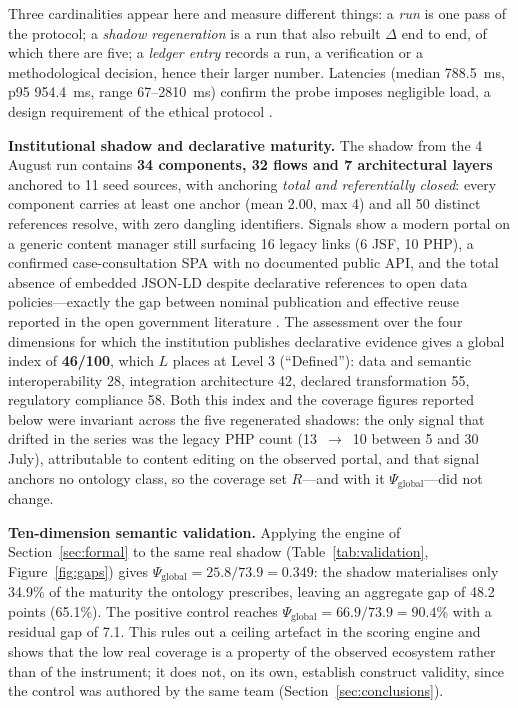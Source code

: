 \documentclass[engproc,proceedingpaper,submit,moreauthors]{Definitions/mdpi}
\begin{document}
    Three cardinalities appear here and measure different things: a \emph{run} is one pass of the protocol; a \emph{shadow regeneration} is a run that also rebuilt $\Delta$ end to end, of which there are five; a \emph{ledger entry} records a run, a verification or a methodological decision, hence their larger number. Latencies (median 788.5~ms, p95 954.4~ms, range 67--2810~ms) confirm the probe imposes negligible load, a design requirement of the ethical protocol \cite{Krotov2020}.

    \textbf{Institutional shadow and declarative maturity.} 
    The shadow from the 4 August run contains \textbf{34 components, 32 flows and 7 architectural layers} anchored to 11 seed sources, with anchoring \emph{total and referentially closed}: every component carries at least one anchor (mean 2.00, max 4) and all 50 distinct references resolve, with zero dangling identifiers. Signals show a modern portal on a generic content manager still surfacing 16 legacy links (6 JSF, 10 PHP), a confirmed case-consultation SPA with no documented public API, and the total absence of embedded JSON-LD despite declarative references to open data policies---exactly the gap between nominal publication and effective reuse reported in the open government literature \cite{Janssen2012,Attard2015}. The assessment over the four dimensions for which the institution publishes declarative evidence gives a global index of \textbf{46/100}, which $L$ places at Level 3 (``Defined''): data and semantic interoperability 28, integration architecture 42, declared transformation 55, regulatory compliance 58. Both this index and the coverage figures reported below were invariant across the five regenerated shadows: the only signal that drifted in the series was the legacy PHP count (13~$\rightarrow$~10 between 5 and 30 July), attributable to content editing on the observed portal, and that signal anchors no ontology class, so the coverage set $R$---and with it $\Psi_{\mathrm{global}}$---did not change.

    \textbf{Ten-dimension semantic validation.} Applying the engine of Section~\ref{sec:formal} to the same real shadow (Table~\ref{tab:validation}, Figure~\ref{fig:gaps}) gives $\Psi_{\mathrm{global}}=25.8/73.9=\mathbf{0.349}$: the shadow materialises only 34.9\% of the maturity the ontology prescribes, leaving an aggregate gap of 48.2 points (65.1\%). The positive control reaches $\Psi_{\mathrm{global}}=66.9/73.9=90.4\%$ with a residual gap of 7.1. This rules out a ceiling artefact in the scoring engine and shows that the low real coverage is a property of the observed ecosystem rather than of the instrument; it does not, on its own, establish construct validity, since the control was authored by the same team (Section~\ref{sec:conclusions}).
\end{document}
